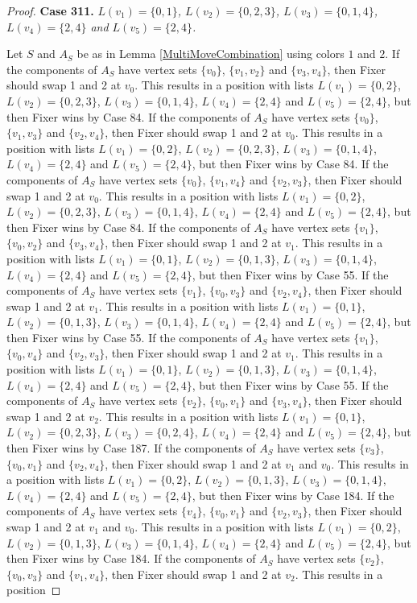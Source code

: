 \documentclass[12pt]{amsart}
\theoremstyle{plain}
\theoremstyle{definition}
\theoremstyle{remark}
\begin{document}
\begin{proof}
\noindent\textbf{Case 311.  }\textit{$L(v_1) = \{0, 1\}$, $L(v_2) = \{0, 2, 3\}$, $L(v_3) = \{0, 1, 4\}$, $L(v_4) = \{2, 4\}$ and $L(v_5) = \{2, 4\}$.}

Let $S$ and $A_S$ be as in Lemma \ref{MultiMoveCombination} using colors $1$ and $2$. If the components of $A_S$ have vertex sets $\{v_0\}$, $\{v_1, v_2\}$ and $\{v_3, v_4\}$, then Fixer should swap 1 and 2 at $v_0$. This results in a position with lists $L(v_1) = \{0, 2\}$, $L(v_2) = \{0, 2, 3\}$, $L(v_3) = \{0, 1, 4\}$, $L(v_4) = \{2, 4\}$ and $L(v_5) = \{2, 4\}$, but then Fixer wins by Case 84. If the components of $A_S$ have vertex sets $\{v_0\}$, $\{v_1, v_3\}$ and $\{v_2, v_4\}$, then Fixer should swap 1 and 2 at $v_0$. This results in a position with lists $L(v_1) = \{0, 2\}$, $L(v_2) = \{0, 2, 3\}$, $L(v_3) = \{0, 1, 4\}$, $L(v_4) = \{2, 4\}$ and $L(v_5) = \{2, 4\}$, but then Fixer wins by Case 84. If the components of $A_S$ have vertex sets $\{v_0\}$, $\{v_1, v_4\}$ and $\{v_2, v_3\}$, then Fixer should swap 1 and 2 at $v_0$. This results in a position with lists $L(v_1) = \{0, 2\}$, $L(v_2) = \{0, 2, 3\}$, $L(v_3) = \{0, 1, 4\}$, $L(v_4) = \{2, 4\}$ and $L(v_5) = \{2, 4\}$, but then Fixer wins by Case 84. If the components of $A_S$ have vertex sets $\{v_1\}$, $\{v_0, v_2\}$ and $\{v_3, v_4\}$, then Fixer should swap 1 and 2 at $v_1$. This results in a position with lists $L(v_1) = \{0, 1\}$, $L(v_2) = \{0, 1, 3\}$, $L(v_3) = \{0, 1, 4\}$, $L(v_4) = \{2, 4\}$ and $L(v_5) = \{2, 4\}$, but then Fixer wins by Case 55. If the components of $A_S$ have vertex sets $\{v_1\}$, $\{v_0, v_3\}$ and $\{v_2, v_4\}$, then Fixer should swap 1 and 2 at $v_1$. This results in a position with lists $L(v_1) = \{0, 1\}$, $L(v_2) = \{0, 1, 3\}$, $L(v_3) = \{0, 1, 4\}$, $L(v_4) = \{2, 4\}$ and $L(v_5) = \{2, 4\}$, but then Fixer wins by Case 55. If the components of $A_S$ have vertex sets $\{v_1\}$, $\{v_0, v_4\}$ and $\{v_2, v_3\}$, then Fixer should swap 1 and 2 at $v_1$. This results in a position with lists $L(v_1) = \{0, 1\}$, $L(v_2) = \{0, 1, 3\}$, $L(v_3) = \{0, 1, 4\}$, $L(v_4) = \{2, 4\}$ and $L(v_5) = \{2, 4\}$, but then Fixer wins by Case 55. If the components of $A_S$ have vertex sets $\{v_2\}$, $\{v_0, v_1\}$ and $\{v_3, v_4\}$, then Fixer should swap 1 and 2 at $v_2$. This results in a position with lists $L(v_1) = \{0, 1\}$, $L(v_2) = \{0, 2, 3\}$, $L(v_3) = \{0, 2, 4\}$, $L(v_4) = \{2, 4\}$ and $L(v_5) = \{2, 4\}$, but then Fixer wins by Case 187. If the components of $A_S$ have vertex sets $\{v_3\}$, $\{v_0, v_1\}$ and $\{v_2, v_4\}$, then Fixer should swap 1 and 2 at $v_1$ and $v_0$. This results in a position with lists $L(v_1) = \{0, 2\}$, $L(v_2) = \{0, 1, 3\}$, $L(v_3) = \{0, 1, 4\}$, $L(v_4) = \{2, 4\}$ and $L(v_5) = \{2, 4\}$, but then Fixer wins by Case 184. If the components of $A_S$ have vertex sets $\{v_4\}$, $\{v_0, v_1\}$ and $\{v_2, v_3\}$, then Fixer should swap 1 and 2 at $v_1$ and $v_0$. This results in a position with lists $L(v_1) = \{0, 2\}$, $L(v_2) = \{0, 1, 3\}$, $L(v_3) = \{0, 1, 4\}$, $L(v_4) = \{2, 4\}$ and $L(v_5) = \{2, 4\}$, but then Fixer wins by Case 184. If the components of $A_S$ have vertex sets $\{v_2\}$, $\{v_0, v_3\}$ and $\{v_1, v_4\}$, then Fixer should swap 1 and 2 at $v_2$. This results in a position 
\end{proof}
\end{document}
